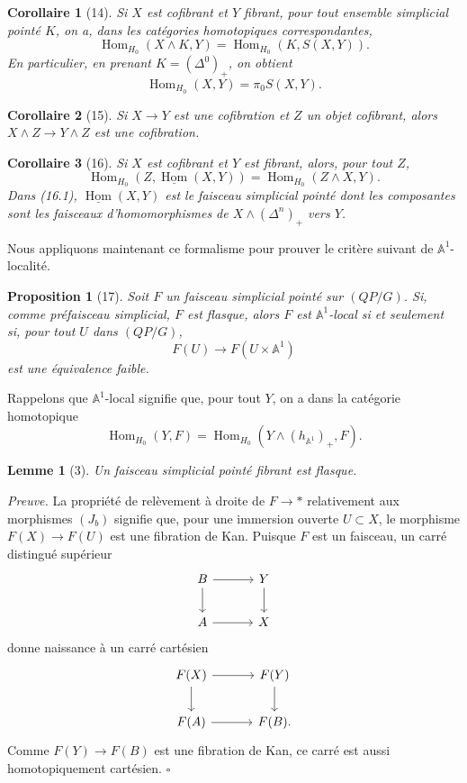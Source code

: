 \documentclass[11pt]{article}
\newcommand{\Aone}{\mathbb A^1}
\newcommand{\Hom}{\operatorname{Hom}}
\theoremstyle{deligne}
\newtheorem*{proposition*}{Proposition}
\newtheorem*{lemma*}{Lemme}
\newtheorem*{corollary*}{Corollaire}
\newenvironment{proofdel}{\noindent\textit{Preuve.}}{\hfill$\square$}
\newcommand{\uHom}{\underline{\Hom}}
\begin{document}
\begin{corollary*}[14]
Si \(X\) est cofibrant et \(Y\) fibrant, pour tout ensemble simplicial pointé \(K\), on a, dans les catégories homotopiques correspondantes,
\[
\Hom_{H_0}(X\wedge K,Y)=\Hom_{H_0}(K,S(X,Y)).
\]
En particulier, en prenant \(K=(\Delta^0)_+\), on obtient
\[
\Hom_{H_0}(X,Y)=\pi_0S(X,Y).
\]
\end{corollary*}

\begin{corollary*}[15]
Si \(X\to Y\) est une cofibration et \(Z\) un objet cofibrant, alors \(X\wedge Z\to Y\wedge Z\) est une cofibration.
\end{corollary*}

\begin{corollary*}[16]
Si \(X\) est cofibrant et \(Y\) est fibrant, alors, pour tout \(Z\),
\[
\Hom_{H_0}(Z,\uHom(X,Y))=\Hom_{H_0}(Z\wedge X,Y). \tag{16.1}
\]
Dans (16.1), \(\uHom(X,Y)\) est le faisceau simplicial pointé dont les composantes sont les faisceaux d'homomorphismes de \(X\wedge(\Delta^n)_+\) vers \(Y\).
\end{corollary*}

Nous appliquons maintenant ce formalisme pour prouver le critère suivant de \(\Aone\)-localité.

\begin{proposition*}[17]
Soit \(F\) un faisceau simplicial pointé sur \((QP/G)\). Si, comme préfaisceau simplicial, \(F\) est flasque, alors \(F\) est \(\Aone\)-local si et seulement si, pour tout \(U\) dans \((QP/G)\),
\[
F(U)\longrightarrow F(U\times\Aone)
\]
est une équivalence faible.
\end{proposition*}

Rappelons que \(\Aone\)-local signifie que, pour tout \(Y\), on a dans la catégorie homotopique
\[
\Hom_{H_0}(Y,F)=\Hom_{H_0}(Y\wedge(h_{\Aone})_+,F). \tag{17.1}
\]

\begin{lemma*}[3]
Un faisceau simplicial pointé fibrant est flasque.
\end{lemma*}

\begin{proofdel}
La propriété de relèvement à droite de \(F\to *\) relativement aux morphismes \((J_b)\) signifie que, pour une immersion ouverte \(U\subset X\), le morphisme \(F(X)\to F(U)\) est une fibration de Kan. Puisque \(F\) est un faisceau, un carré distingué supérieur
\[
\begin{tikzcd}[column sep=3.2em,row sep=2.0em]
B \arrow[r] \arrow[d] & Y \arrow[d] \\
A \arrow[r] & X
\end{tikzcd}
\]
donne naissance à un carré cartésien
\[
\begin{tikzcd}[column sep=3.2em,row sep=2.0em]
F(X) \arrow[r] \arrow[d] & F(Y) \arrow[d] \\
F(A) \arrow[r] & F(B).
\end{tikzcd}
\]
Comme \(F(Y)\to F(B)\) est une fibration de Kan, ce carré est aussi homotopiquement cartésien.
\end{proofdel}
\end{document}
